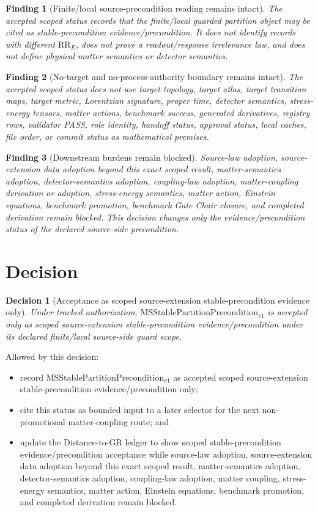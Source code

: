 \documentclass[11pt]{article}
\newcommand{\MSStablePre}{\mathrm{MSStablePartitionPrecondition}_{v1}}
\newtheorem{decision}{Decision}
\newtheorem{finding}{Finding}
\begin{document}
\begin{finding}[Finite/local source-precondition reading remains intact]
The accepted scoped status records that the finite/local guarded partition
object may be cited as stable-precondition evidence/precondition. It does not
identify records with different \(\mathrm{RR}_E\), does not prove a
readout/response irrelevance law, and does not define physical matter
semantics or detector semantics.
\end{finding}

\begin{finding}[No-target and no-process-authority boundary remains intact]
The accepted scoped status does not use target topology, target atlas, target
transition maps, target metric, Lorentzian signature, proper time, detector
semantics, stress-energy tensors, matter actions, benchmark success,
generated derivatives, registry rows, validator PASS, role identity, handoff
status, approval status, local caches, file order, or commit status as
mathematical premises.
\end{finding}

\begin{finding}[Downstream burdens remain blocked]
Source-law adoption, source-extension data adoption beyond this exact scoped
result, matter-semantics adoption, detector-semantics adoption, coupling-law
adoption, matter-coupling derivation or adoption, stress-energy semantics,
matter action, Einstein equations, benchmark promotion, benchmark Gate Chair
closure, and completed derivation remain blocked. This decision changes only
the evidence/precondition status of the declared source-side precondition.
\end{finding}

\section{Decision}

\begin{decision}[Acceptance as scoped source-extension stable-precondition evidence only]
Under tracked authorization, \(\MSStablePre\) is accepted only as scoped
source-extension stable-precondition evidence/precondition under its declared
finite/local source-side guard scope.
\end{decision}

Allowed by this decision:
\begin{itemize}[leftmargin=*]
  \item record \(\MSStablePre\) as accepted scoped source-extension
  stable-precondition evidence/precondition only;
  \item cite this status as bounded input to a later selector for the next
  non-promotional matter-coupling route; and
  \item update the Distance-to-GR ledger to show scoped stable-precondition
  evidence/precondition acceptance while source-law adoption,
  source-extension data adoption beyond this exact scoped result,
  matter-semantics adoption, detector-semantics adoption, coupling-law
  adoption, matter coupling, stress-energy semantics, matter action, Einstein
  equations, benchmark promotion, and completed derivation remain blocked.
\end{itemize}
\end{document}
